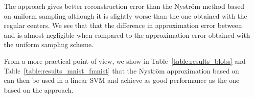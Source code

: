 The \qkmeans approach gives better reconstruction error than the Nyström method based on uniform sampling although it is slightly worse than the one obtained with the regular \kmeans centers. We see that that the difference in approximation error between \kmeans and \qkmeans is almost negligible when compared to the approximation error obtained with the uniform sampling scheme.

From a more practical point of view, we show in Table~\ref{table:results_blobs} and Table~\ref{table:results_mnist_fmnist} that the Nyström approximation based on \qkmeans can then be used in a linear SVM and achieve as good performance as the one based on the \kmeans approach.









